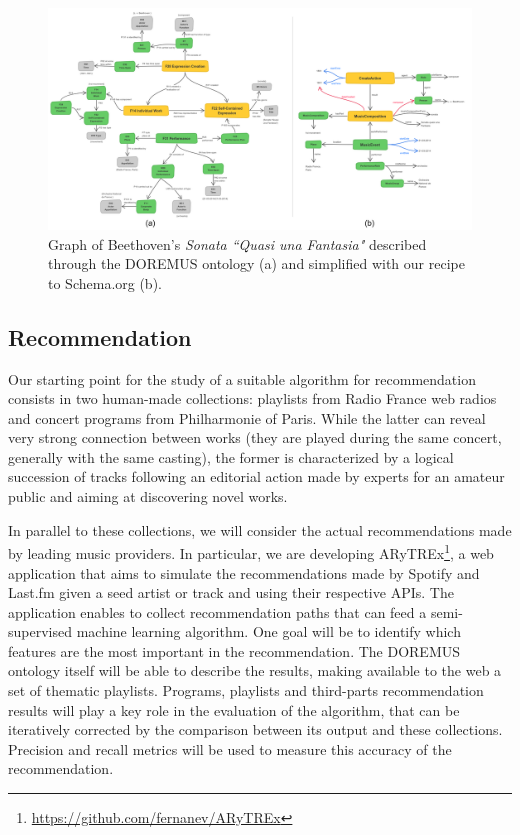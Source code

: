 \documentclass{llncs}
\begin{document}
\begin{figure}
\includegraphics[width=12cm]{img/Beethoven-mapping.png}
\centering
\caption{Graph of Beethoven's \textit{Sonata ``Quasi una Fantasia"} described through the DOREMUS ontology (a) and simplified with our recipe to Schema.org  (b).}
\label{fig:beethoven-mapping}
\end{figure}

\subsection{Recommendation}
Our starting point for the study of a suitable algorithm for recommendation consists in two human-made collections: playlists from Radio France web radios and concert programs from Philharmonie of Paris. While the latter can reveal very strong connection between works (they are played during the same concert, generally with the same casting), the former is characterized by a logical succession of tracks following an editorial action made by experts for an amateur public and aiming at discovering novel works.

In parallel to these collections, we will consider the actual recommendations made by leading music providers. In particular, we are developing ARyTREx\footnote{\url{https://github.com/fernanev/ARyTREx}}, a web application that aims to simulate the recommendations made by Spotify and Last.fm given a seed artist or track and using their respective APIs. The application enables to collect recommendation paths that can feed a semi-supervised machine learning algorithm. One goal will be to identify which features are the most important in the recommendation. The DOREMUS ontology itself will be able to describe the results, making available to the web a set of thematic playlists. Programs, playlists and third-parts recommendation results will play a key role in the evaluation of the algorithm, that can be iteratively corrected by the comparison between its output and these collections. Precision and recall metrics will be used to measure this accuracy of the recommendation.
\end{document}
